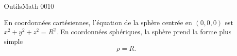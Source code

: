 
\begin{corrige}{OutilsMath-0010}

	En coordonnées cartésiennes, l'équation de la sphère centrée en $(0,0,0)$ est $x^2+y^2+z^2=R^2$. En coordonnées sphériques, la sphère prend la forme plus simple
	\begin{equation}
		\rho=R.
	\end{equation}

\end{corrige}

